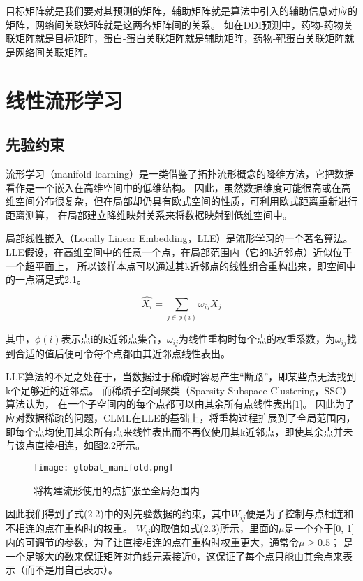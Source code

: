 目标矩阵就是我们要对其预测的矩阵，辅助矩阵就是算法中引入的辅助信息对应的矩阵，网络间关联矩阵就是这两各矩阵间的关系。
如在DDI预测中，药物-药物关联矩阵就是目标矩阵，蛋白-蛋白关联矩阵就是辅助矩阵，药物-靶蛋白关联矩阵就是网络间关联矩阵。


\section{线性流形学习}
\subsection{先验约束}
\label{method:subsec:prior}
流形学习（manifold learning）是一类借鉴了拓扑流形概念的降维方法，它把数据看作是一个嵌入在高维空间中的低维结构。
因此，虽然数据维度可能很高或在高维空间分布很复杂，但在局部却仍具有欧式空间的性质，可利用欧式距离重新进行距离测算，
在局部建立降维映射关系来将数据映射到低维空间中。


局部线性嵌入（Locally Linear Embedding，LLE）是流形学习的一个著名算法。
LLE假设，在高维空间中的任意一个点，在局部范围内（它的k近邻点）近似位于一个超平面上，
所以该样本点可以通过其k近邻点的线性组合重构出来，即空间中的一点满足式2.1。


\begin{equation}
    \hat{X_i}=\sum_{j\in\phi(i)}\omega_{ij}X_j
\end{equation}

其中，$\phi(i)$表示点i的k近邻点集合，$\omega_{ij}$为线性重构时每个点的权重系数，为$\omega_{ij}$找到合适的值后便可令每个点都由其近邻点线性表出。


LLE算法的不足之处在于，当数据过于稀疏时容易产生“断路”，即某些点无法找到k个足够近的近邻点。
而稀疏子空间聚类（Sparsity Subspace Clustering，SSC）算法认为，
在一个子空间内的每个点都可以由其余所有点线性表出[1]。
因此为了应对数据稀疏的问题，CLML在LLE的基础上，将重构过程扩展到了全局范围内，
即每个点均使用其余所有点来线性表出而不再仅使用其k近邻点，即使其余点并未与该点直接相连，如图2.2所示。

\begin{figure}
    \centering
    \texttt{[image: global\_manifold.png]}
    \caption{将构建流形使用的点扩张至全局范围内}
\end{figure}

因此我们得到了式(2.2)中的对先验数据的约束，其中$W_{ij}$便是为了控制与点相连和不相连的点在重构时的权重。
$W_{ij}$的取值如式(2.3)所示，里面的$\mu$是一个介于[0, 1]内的可调节的参数，为了让直接相连的点在重构时权重更大，通常令$\mu\geq0.5$；
是一个足够大的数来保证矩阵对角线元素接近0，这保证了每个点只能由其余点来表示（而不是用自己表示）。


